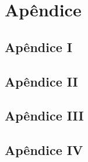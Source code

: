 \chapter{Apêndice}

\section*{Apêndice I}



\section*{Apêndice II}



\section*{Apêndice III}



\section*{Apêndice IV}

